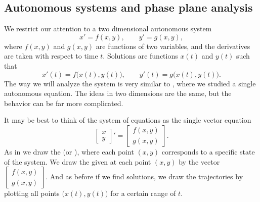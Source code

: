 \documentclass[12pt]{book}
\begin{document}
\subsection{Autonomous systems and phase plane analysis}

We restrict our attention to a two dimensional autonomous system
\begin{equation*}
x' = f(x,y) , \qquad y' = g(x,y) ,
\end{equation*}
where $f(x,y)$ and $g(x,y)$ are functions of two variables, and the
derivatives are taken with respect to time $t$.  Solutions are
functions $x(t)$ and $y(t)$ such that
\begin{equation*}
x'(t) = f\bigl(x(t),y(t)\bigr), \qquad
y'(t) = g\bigl(x(t),y(t)\bigr) .
\end{equation*}
The way we will analyze the system is very similar to
, where we studied a single autonomous equation.  The
ideas in two dimensions are the same, but the behavior can be
far more complicated.

It may be best to think of the system of equations as the single vector equation
\begin{equation} \label{eq:nlinautn2}
\begin{bmatrix} x \\ y \end{bmatrix} ' =
\begin{bmatrix} f(x,y) \\ g(x,y) \end{bmatrix} .
\end{equation}
As in  we draw
the \emph{} (or \emph{}),
where each point $(x,y)$ corresponds to a specific state of the system.
We draw the \emph{}
given at each
point $(x,y)$ by the vector
$\left[ \begin{smallmatrix} f(x,y) \\ g(x,y) \end{smallmatrix} \right]$.
And as before if we find solutions, we draw the trajectories
by plotting all points $\bigl(x(t),y(t)\bigr)$ for a certain range of $t$.
\end{document}
